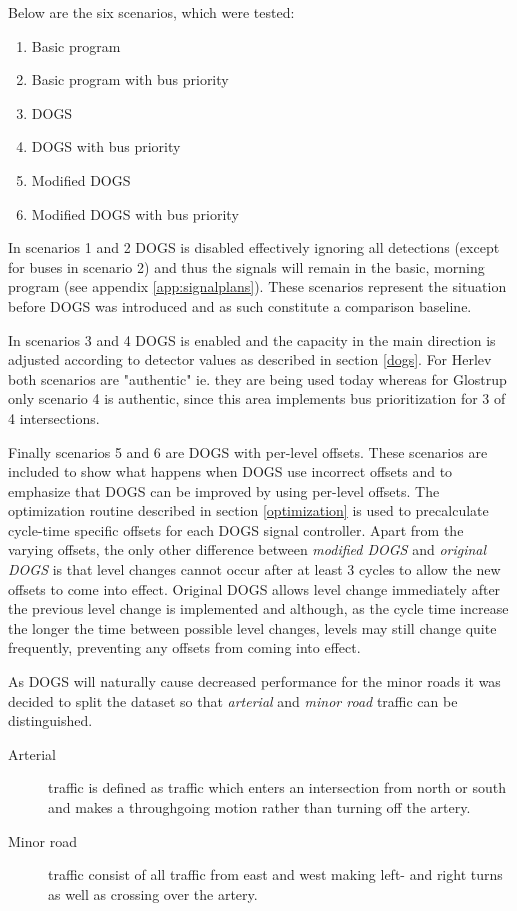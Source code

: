 Below are the six scenarios, which were tested:

\begin{enumerate}
\item Basic program
\item Basic program with bus priority
\item DOGS
\item DOGS with bus priority
\item Modified DOGS
\item Modified DOGS with bus priority
\end{enumerate}

In scenarios 1 and 2 DOGS is disabled effectively ignoring all detections (except for buses in scenario 2) and thus the signals will remain in the basic, morning program (see appendix \ref{app:signalplans}). These scenarios represent the situation before DOGS was introduced and as such constitute a comparison baseline.

In scenarios 3 and 4 DOGS is enabled and the capacity in the main direction is adjusted according to detector values as described in section \ref{dogs}. For Herlev both scenarios are "authentic" ie. they are being used today whereas for Glostrup only scenario 4 is authentic, since this area implements bus prioritization for 3 of 4 intersections.

Finally scenarios 5 and 6 are DOGS with per-level offsets. These scenarios are included to show what happens when DOGS use incorrect offsets and to emphasize that DOGS can be improved by using per-level offsets. 
The optimization routine described in section \ref{optimization} is used to precalculate cycle-time specific offsets for each DOGS signal controller. 
Apart from the varying offsets, the only other difference between \textit{modified DOGS} and \textit{original DOGS} is that level changes cannot occur after at least 3 cycles to allow the new offsets to come into effect. Original DOGS allows level change immediately after the previous level change is implemented and although, as the cycle time increase the longer the time between possible level changes, levels may still change quite frequently, preventing any offsets from coming into effect.

As DOGS will naturally cause decreased performance for the minor roads it was decided to split the dataset so that \textit{arterial} and \textit{minor road} traffic can be distinguished. 

\begin{description}
\item[Arterial] traffic is defined as traffic which enters an intersection from north or south and makes a throughgoing motion rather than turning off the artery. 
\item[Minor road] traffic consist of all traffic from east and west making left- and right turns as well as crossing over the artery.
\end{description}

